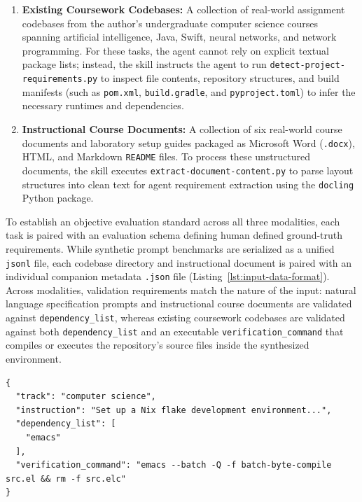 \begin{enumerate}
	\item \textbf{Existing Coursework Codebases:} A collection of real-world
	      assignment codebases from the author's undergraduate computer science
	      courses spanning artificial intelligence, Java, Swift, neural networks,
	      and network programming. For these tasks, the agent cannot rely on
	      explicit textual package lists; instead, the skill instructs the agent
	      to run \texttt{detect-project-requirements.py} to inspect file contents,
	      repository structures, and build manifests (such as \texttt{pom.xml},
	      \texttt{build.gradle}, and \texttt{pyproject.toml}) to infer the
	      necessary runtimes and dependencies.

	\item \textbf{Instructional Course Documents:} A collection of six real-world
	      course documents and laboratory setup guides packaged as Microsoft Word
	      (\texttt{.docx}), HTML, and Markdown \texttt{README} files. To process these
	      unstructured documents, the skill executes \texttt{extract-document-content.py}
	      to parse layout structures into clean text for agent requirement extraction
	      using the \texttt{docling}\cite{researchDoclingGetYour2024} Python package.
\end{enumerate}

To establish an objective evaluation standard across all three modalities, each task
is paired with an evaluation schema defining human defined ground-truth requirements.
While synthetic prompt benchmarks are serialized as a unified \texttt{jsonl} file,
each codebase directory and instructional document is paired with an individual
companion metadata \texttt{.json} file (Listing~\ref{lst:input-data-format}).
Across modalities, validation requirements match the nature of the input:
natural language specification prompts and instructional course documents are
validated against \texttt{dependency\_list}, whereas existing coursework
codebases are validated against both \texttt{dependency\_list} and an executable \texttt{verification\_command}
that compiles or executes the repository's source files inside the synthesized
environment.

\begin{lstlisting}[caption={Evaluation Metadata Format and Ground-Truth Schema}, label={lst:input-data-format}]
{
  "track": "computer science",
  "instruction": "Set up a Nix flake development environment...",
  "dependency_list": [
    "emacs"
  ],
  "verification_command": "emacs --batch -Q -f batch-byte-compile src.el && rm -f src.elc"
}
\end{lstlisting}

